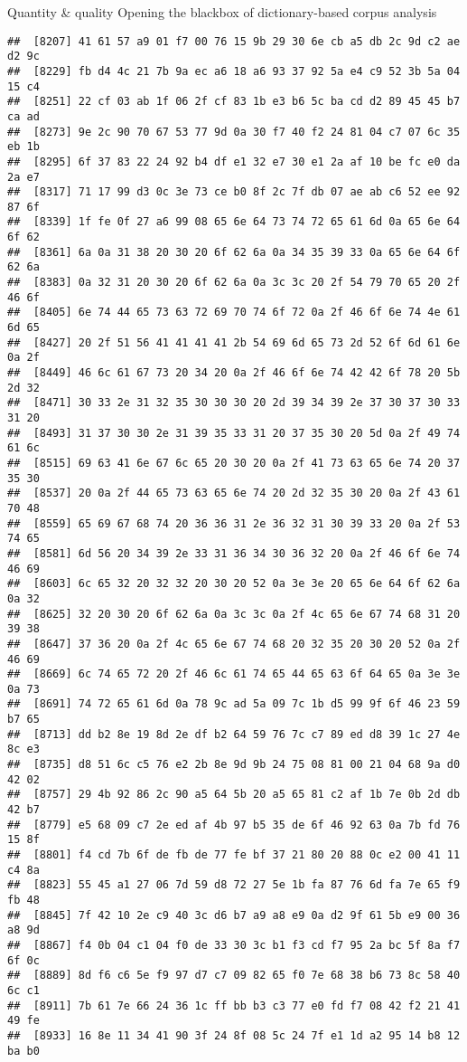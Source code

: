 \documentclass[
  ignorenonframetext,
]{beamer}
\begin{document}
\begin{frame}[fragile]{Quantity \& quality \textbar{} Opening the
blackbox of dictionary-based corpus analysis}
\begin{verbatim}
##  [8207] 41 61 57 a9 01 f7 00 76 15 9b 29 30 6e cb a5 db 2c 9d c2 ae d2 9c
##  [8229] fb d4 4c 21 7b 9a ec a6 18 a6 93 37 92 5a e4 c9 52 3b 5a 04 15 c4
##  [8251] 22 cf 03 ab 1f 06 2f cf 83 1b e3 b6 5c ba cd d2 89 45 45 b7 ca ad
##  [8273] 9e 2c 90 70 67 53 77 9d 0a 30 f7 40 f2 24 81 04 c7 07 6c 35 eb 1b
##  [8295] 6f 37 83 22 24 92 b4 df e1 32 e7 30 e1 2a af 10 be fc e0 da 2a e7
##  [8317] 71 17 99 d3 0c 3e 73 ce b0 8f 2c 7f db 07 ae ab c6 52 ee 92 87 6f
##  [8339] 1f fe 0f 27 a6 99 08 65 6e 64 73 74 72 65 61 6d 0a 65 6e 64 6f 62
##  [8361] 6a 0a 31 38 20 30 20 6f 62 6a 0a 34 35 39 33 0a 65 6e 64 6f 62 6a
##  [8383] 0a 32 31 20 30 20 6f 62 6a 0a 3c 3c 20 2f 54 79 70 65 20 2f 46 6f
##  [8405] 6e 74 44 65 73 63 72 69 70 74 6f 72 0a 2f 46 6f 6e 74 4e 61 6d 65
##  [8427] 20 2f 51 56 41 41 41 41 2b 54 69 6d 65 73 2d 52 6f 6d 61 6e 0a 2f
##  [8449] 46 6c 61 67 73 20 34 20 0a 2f 46 6f 6e 74 42 42 6f 78 20 5b 2d 32
##  [8471] 30 33 2e 31 32 35 30 30 30 20 2d 39 34 39 2e 37 30 37 30 33 31 20
##  [8493] 31 37 30 30 2e 31 39 35 33 31 20 37 35 30 20 5d 0a 2f 49 74 61 6c
##  [8515] 69 63 41 6e 67 6c 65 20 30 20 0a 2f 41 73 63 65 6e 74 20 37 35 30
##  [8537] 20 0a 2f 44 65 73 63 65 6e 74 20 2d 32 35 30 20 0a 2f 43 61 70 48
##  [8559] 65 69 67 68 74 20 36 36 31 2e 36 32 31 30 39 33 20 0a 2f 53 74 65
##  [8581] 6d 56 20 34 39 2e 33 31 36 34 30 36 32 20 0a 2f 46 6f 6e 74 46 69
##  [8603] 6c 65 32 20 32 32 20 30 20 52 0a 3e 3e 20 65 6e 64 6f 62 6a 0a 32
##  [8625] 32 20 30 20 6f 62 6a 0a 3c 3c 0a 2f 4c 65 6e 67 74 68 31 20 39 38
##  [8647] 37 36 20 0a 2f 4c 65 6e 67 74 68 20 32 35 20 30 20 52 0a 2f 46 69
##  [8669] 6c 74 65 72 20 2f 46 6c 61 74 65 44 65 63 6f 64 65 0a 3e 3e 0a 73
##  [8691] 74 72 65 61 6d 0a 78 9c ad 5a 09 7c 1b d5 99 9f 6f 46 23 59 b7 65
##  [8713] dd b2 8e 19 8d 2e df b2 64 59 76 7c c7 89 ed d8 39 1c 27 4e 8c e3
##  [8735] d8 51 6c c5 76 e2 2b 8e 9d 9b 24 75 08 81 00 21 04 68 9a d0 42 02
##  [8757] 29 4b 92 86 2c 90 a5 64 5b 20 a5 65 81 c2 af 1b 7e 0b 2d db 42 b7
##  [8779] e5 68 09 c7 2e ed af 4b 97 b5 35 de 6f 46 92 63 0a 7b fd 76 15 8f
##  [8801] f4 cd 7b 6f de fb de 77 fe bf 37 21 80 20 88 0c e2 00 41 11 c4 8a
##  [8823] 55 45 a1 27 06 7d 59 d8 72 27 5e 1b fa 87 76 6d fa 7e 65 f9 fb 48
##  [8845] 7f 42 10 2e c9 40 3c d6 b7 a9 a8 e9 0a d2 9f 61 5b e9 00 36 a8 9d
##  [8867] f4 0b 04 c1 04 f0 de 33 30 3c b1 f3 cd f7 95 2a bc 5f 8a f7 6f 0c
##  [8889] 8d f6 c6 5e f9 97 d7 c7 09 82 65 f0 7e 68 38 b6 73 8c 58 40 6c c1
##  [8911] 7b 61 7e 66 24 36 1c ff bb b3 c3 77 e0 fd f7 08 42 f2 21 41 49 fe
##  [8933] 16 8e 11 34 41 90 3f 24 8f 08 5c 24 7f e1 1d a2 95 14 b8 12 ba b0

\end{verbatim}
\end{frame}
\end{document}
